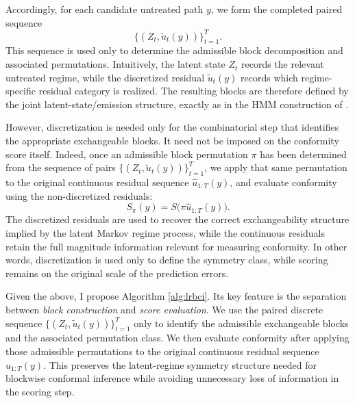 \documentclass{article}
\begin{document}
Accordingly, for each candidate untreated path \(y\), we form the completed paired sequence
\[
\big\{(Z_t,\tilde u_t(y))\big\}_{t=1}^T.
\]
This sequence is used only to determine the admissible block decomposition and associated permutations. Intuitively, the latent state \(Z_t\) records the relevant untreated regime, while the discretized residual \(\tilde u_t(y)\) records which regime-specific residual category is realized. The resulting blocks are therefore defined by the joint latent-state/emission structure, exactly as in the HMM construction of \citet{Nettasinghe2023}.

However, discretization is needed only for the combinatorial step that identifies the appropriate exchangeable blocks. It need not be imposed on the conformity score itself. Indeed, once an admissible block permutation \(\pi\) has been determined from the sequence of pairs \(\{(Z_t,\tilde u_t(y))\}_{t=1}^T\), we apply that same permutation to the original continuous residual sequence \(\hat u_{1:T}(y)\), and evaluate conformity using the non-discretized residuals:
\[
S_\pi(y)=S\big(\pi \hat u_{1:T}(y)\big).
\]
The discretized residuals are used to recover the correct exchangeability structure implied by the latent Markov regime process, while the continuous residuals retain the full magnitude information relevant for measuring conformity. In other words, discretization is used only to define the symmetry class, while scoring remains on the original scale of the prediction errors.


Given the above, I propose Algorithm \ref{alg:lrbci}. Its key feature is the separation between \emph{block construction} and \emph{score evaluation}. We use the paired discrete sequence $\{(Z_t,\tilde u_t(y))\}_{t=1}^T$ only to identify the admissible exchangeable blocks and the associated permutation class. We then evaluate conformity after applying those admissible permutations to the original continuous residual sequence $\hat u_{1:T}(y)$. This preserves the latent-regime symmetry structure needed for blockwise conformal inference while avoiding unnecessary loss of information in the scoring step.
\end{document}
